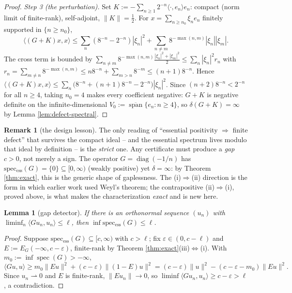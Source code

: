 \documentclass[11pt,reqno]{amsart}
\newtheorem{lemma}[theorem]{Lemma}
\theoremstyle{definition}
\newtheorem{remark}[theorem]{Remark}
\newcommand{\spec}{\operatorname{spec}}
\newcommand{\specess}{\operatorname{spec_{ess}}}
\newcommand{\half}{\tfrac12}
\begin{document}
\begin{proof}
\emph{Step 3 (the perturbation).} Set
\(K:=-\sum_{n\geq1}2^{-n}\langle\cdot,e_n\rangle e_n\): compact (norm limit of
finite-rank), self-adjoint, \(\|K\|=\half\). For
\(x=\sum_{n\geq n_0}\xi_n e_n\) finitely supported in \(\{n\geq n_0\}\),
\[
\langle(G+K)x,x\rangle\leq\sum_n(8^{-n}-2^{-n})|\xi_n|^2
+\sum_{n\neq m}8^{-\max(n,m)}|\xi_n||\xi_m|.
\]
The cross term is bounded by
\(\sum_{n\neq m}8^{-\max(n,m)}\tfrac{|\xi_n|^2+|\xi_m|^2}{2}
\leq\sum_n|\xi_n|^2 r_n\) with
\(r_n=\sum_{m\neq n}8^{-\max(n,m)}\leq n8^{-n}+\sum_{m>n}8^{-m}\leq(n+1)8^{-n}\).
Hence
\(\langle(G+K)x,x\rangle\leq\sum_n\bigl(8^{-n}+(n+1)8^{-n}-2^{-n}\bigr)|\xi_n|^2\).
Since \((n+2)8^{-n}<2^{-n}\) for all \(n\geq4\), taking \(n_0=4\) makes every
coefficient negative: \(G+K\) is negative definite on the
infinite-dimensional \(V_0:=\overline{\operatorname{span}}\{e_n:n\geq4\}\), so
\(\delta(G+K)=\infty\) by Lemma \ref{lem:defect-spectral}.
\end{proof}

\begin{remark}[the design lesson]\label{rem:design}
The only reading of ``essential positivity \(\Rightarrow\) finite defect'' that
survives the compact ideal -- and the essential spectrum lives modulo that ideal
by definition -- is the \emph{strict} one. Any certificate must produce a
\emph{gap} \(c>0\), not merely a sign. The operator \(G=\operatorname{diag}(-1/n)\)
has \(\specess(G)=\{0\}\subseteq[0,\infty)\) (weakly positive) yet
\(\delta=\infty\): by Theorem \ref{thm:exact}, this is the generic shape of
gaplessness. The (i)\(\Rightarrow\)(ii) direction is the form in which earlier
work \cite{P40} used Weyl's theorem; the contrapositive (ii)\(\Rightarrow\)(i),
proved above, is what makes the characterization \emph{exact} and is new here.
\end{remark}

\begin{lemma}[gap detector]\label{lem:gap-detector}
If there is an orthonormal sequence \((u_n)\) with
\(\liminf_n\langle Gu_n,u_n\rangle\leq\ell\), then
\(\inf\specess(G)\leq\ell\).
\end{lemma}

\begin{proof}
Suppose \(\specess(G)\subseteq[c,\infty)\) with \(c>\ell\); fix
\(\varepsilon\in(0,c-\ell)\) and \(E:=E_G(-\infty,c-\varepsilon)\), finite-rank
by Theorem \ref{thm:exact}(iii)\(\Leftrightarrow\)(i). With
\(m_0:=\inf\spec(G)>-\infty\),
\[
\langle Gu,u\rangle\geq m_0\|Eu\|^2+(c-\varepsilon)\|(1-E)u\|^2
=(c-\varepsilon)\|u\|^2-(c-\varepsilon-m_0)\|Eu\|^2 .
\]
Since \(u_n\rightharpoonup0\) and \(E\) is finite-rank, \(\|Eu_n\|\to0\), so
\(\liminf\langle Gu_n,u_n\rangle\geq c-\varepsilon>\ell\), a contradiction.
\end{proof}
\end{document}
